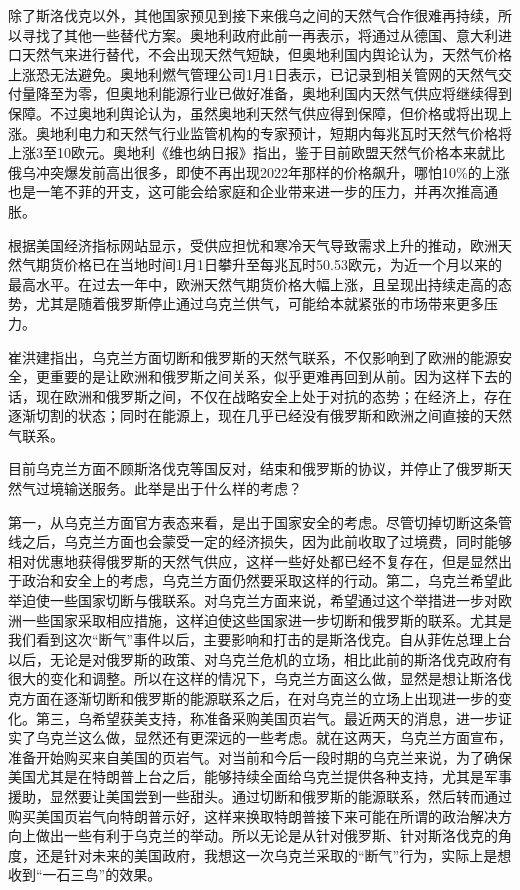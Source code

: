除了斯洛伐克以外，其他国家预见到接下来俄乌之间的天然气合作很难再持续，所以寻找了其他一些替代方案。奥地利政府此前一再表示，将通过从德国、意大利进口天然气来进行替代，不会出现天然气短缺，但奥地利国内舆论认为，天然气价格上涨恐无法避免。奥地利燃气管理公司1月1日表示，已记录到相关管网的天然气交付量降至为零，但奥地利能源行业已做好准备，奥地利国内天然气供应将继续得到保障。不过奥地利舆论认为，虽然奥地利天然气供应得到保障，但价格或将出现上涨。奥地利电力和天然气行业监管机构的专家预计，短期内每兆瓦时天然气价格将上涨3至10欧元。奥地利《维也纳日报》指出，鉴于目前欧盟天然气价格本来就比俄乌冲突爆发前高出很多，即使不再出现2022年那样的价格飙升，哪怕10\%的上涨也是一笔不菲的开支，这可能会给家庭和企业带来进一步的压力，并再次推高通胀。

根据美国经济指标网站显示，受供应担忧和寒冷天气导致需求上升的推动，欧洲天然气期货价格已在当地时间1月1日攀升至每兆瓦时50.53欧元，为近一个月以来的最高水平。在过去一年中，欧洲天然气期货价格大幅上涨，且呈现出持续走高的态势，尤其是随着俄罗斯停止通过乌克兰供气，可能给本就紧张的市场带来更多压力。

崔洪建指出，乌克兰方面切断和俄罗斯的天然气联系，不仅影响到了欧洲的能源安全，更重要的是让欧洲和俄罗斯之间关系，似乎更难再回到从前。因为这样下去的话，现在欧洲和俄罗斯之间，不仅在战略安全上处于对抗的态势；在经济上，存在逐渐切割的状态；同时在能源上，现在几乎已经没有俄罗斯和欧洲之间直接的天然气联系。

目前乌克兰方面不顾斯洛伐克等国反对，结束和俄罗斯的协议，并停止了俄罗斯天然气过境输送服务。此举是出于什么样的考虑？

第一，从乌克兰方面官方表态来看，是出于国家安全的考虑。尽管切掉切断这条管线之后，乌克兰方面也会蒙受一定的经济损失，因为此前收取了过境费，同时能够相对优惠地获得俄罗斯的天然气供应，这样一些好处都已经不复存在，但是显然出于政治和安全上的考虑，乌克兰方面仍然要采取这样的行动。第二，乌克兰希望此举迫使一些国家切断与俄联系。对乌克兰方面来说，希望通过这个举措进一步对欧洲一些国家采取相应措施，这样迫使这些国家进一步切断和俄罗斯的联系。尤其是我们看到这次“断气”事件以后，主要影响和打击的是斯洛伐克。自从菲佐总理上台以后，无论是对俄罗斯的政策、对乌克兰危机的立场，相比此前的斯洛伐克政府有很大的变化和调整。所以在这样的情况下，乌克兰方面这么做，显然是想让斯洛伐克方面在逐渐切断和俄罗斯的能源联系之后，在对乌克兰的立场上出现进一步的变化。第三，乌希望获美支持，称准备采购美国页岩气。最近两天的消息，进一步证实了乌克兰这么做，显然还有更深远的一些考虑。就在这两天，乌克兰方面宣布，准备开始购买来自美国的页岩气。对当前和今后一段时期的乌克兰来说，为了确保美国尤其是在特朗普上台之后，能够持续全面给乌克兰提供各种支持，尤其是军事援助，显然要让美国尝到一些甜头。通过切断和俄罗斯的能源联系，然后转而通过购买美国页岩气向特朗普示好，这样来换取特朗普接下来可能在所谓的政治解决方向上做出一些有利于乌克兰的举动。所以无论是从针对俄罗斯、针对斯洛伐克的角度，还是针对未来的美国政府，我想这一次乌克兰采取的“断气”行为，实际上是想收到“一石三鸟”的效果。

